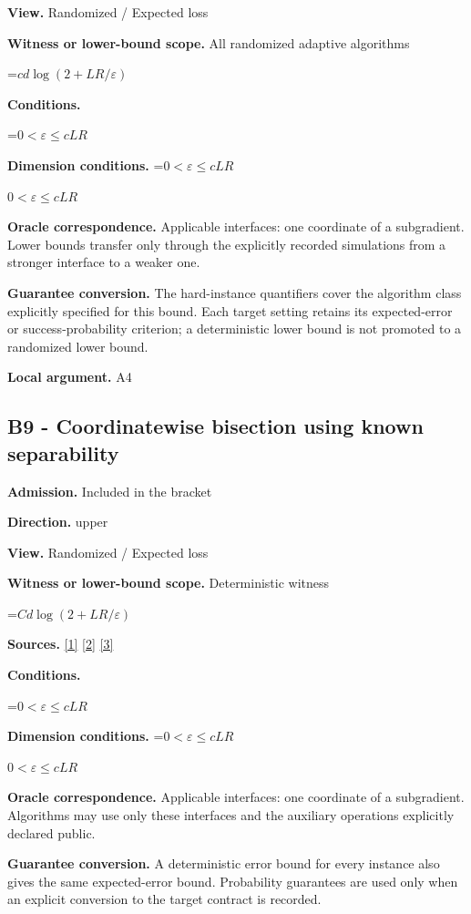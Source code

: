 \documentclass[10pt,a4paper]{article}
\newcommand{\AtlasMath}[1]{\par\begingroup\centering\setbox0=\hbox{$\displaystyle #1$}\ifdim\wd0>1.4\linewidth\typeout{ATLAS WIDE FORMULA: \the\wd0}\fi\ifdim\wd0>\linewidth\resizebox{\linewidth}{!}{\box0}\else\box0\fi\par\endgroup}
\newcommand{\AtlasInlineMath}[1]{\begingroup\setbox0=\hbox{$#1$}\ifdim\wd0>.4\linewidth\endgroup\AtlasMath{#1}\else\endgroup$#1$\fi}
\begin{document}
\textbf{View.} Randomized / Expected loss

\textbf{Witness or lower-bound scope.} All randomized adaptive algorithms

\AtlasMath{cd\log(2+LR/\varepsilon)}
\textbf{Conditions.} 
\AtlasMath{0<\varepsilon\le cLR}


\textbf{Dimension conditions.} \AtlasInlineMath{0<\varepsilon\le cLR}

\textbf{Oracle correspondence.} Applicable interfaces: one coordinate of a subgradient. Lower bounds transfer only through the explicitly recorded simulations from a stronger interface to a weaker one.

\textbf{Guarantee conversion.} The hard-instance quantifiers cover the algorithm class explicitly specified for this bound. Each target setting retains its expected-error or success-probability criterion; a deterministic lower bound is not promoted to a randomized lower bound.

\textbf{Local argument.} A4

\subsection{B9 - Coordinatewise bisection using known separability}
\textbf{Admission.} Included in the bracket

\textbf{Direction.} upper

\textbf{View.} Randomized / Expected loss

\textbf{Witness or lower-bound scope.} Deterministic witness

\AtlasMath{Cd\log(2+LR/\varepsilon)}
\textbf{Sources.} \href{https://arxiv.org/pdf/1405.4980}{[1]} \href{https://www2.isye.gatech.edu/~nemirovs/MOR_AccuracyCertificates.pdf}{[2]} \href{https://arxiv.org/pdf/2609.20701}{[3]}

\textbf{Conditions.} 
\AtlasMath{0<\varepsilon\le cLR}


\textbf{Dimension conditions.} \AtlasInlineMath{0<\varepsilon\le cLR}

\textbf{Oracle correspondence.} Applicable interfaces: one coordinate of a subgradient. Algorithms may use only these interfaces and the auxiliary operations explicitly declared public.

\textbf{Guarantee conversion.} A deterministic error bound for every instance also gives the same expected-error bound. Probability guarantees are used only when an explicit conversion to the target contract is recorded.
\end{document}
